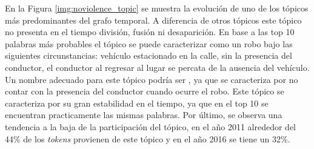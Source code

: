 En la Figura \ref{img:noviolence_topic} se muestra la evolución de uno de los tópicos más predominantes del grafo temporal. A diferencia de otros tópicos este tópico no presenta en el tiempo división, fusión ni desaparición. En base a las top 10 palabras más probables el tópico se puede caracterizar como un robo bajo las siguientes circunstancias: vehículo estacionado en la calle, sin la presencia del conductor, el conductor al regresar al lugar se percata de la ausencia del vehículo. Un nombre adecuado para este tópico podría ser , ya que se caracteriza por no contar con la presencia del conductor cuando ocurre el robo. Este tópico se caracteriza por su gran estabilidad en el tiempo, ya que en el top 10 se encuentran practicamente las mismas palabras. Por último, se observa una tendencia a la baja de la participación del tópico, en el año 2011 alrededor del 44\% de los \textit{tokens} provienen de este tópico y en el año 2016 se tiene un 32\%.


\def\topic[#1,#2,#3,#4,#5,#6]#7{
        \node[fill=#1, rounded corners, minimum height=#2, minimum width=#3, text width=4em] (#5) at #6 {}; 
        \node[anchor=#4,inner sep=2pt,] at (#5.#4)  {#7};
}
\def\tedge[#1,#2,#3,#4,#5];{ 
  \definecolor{color0}{RGB}{153,153,153}
  \draw[color=color0,#4,fill=white, line width=4*#5pt] (#1) -- #3
  (#2);  
}


